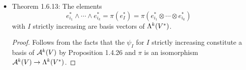 \documentclass[../notes.tex]{subfiles}
\begin{document}
\begin{itemize}
\begin{itemize}
    \end{itemize}
    \item Theorem 1.6.13: The elements
    \begin{equation*}
        e_{i_1}^*\wedge\cdots\wedge e_{i_k}^* = \pi(e_I^*) = \pi(e_{i_1}^*\otimes\cdots\otimes e_{i_k}^*)
    \end{equation*}
    with $I$ strictly increasing are basis vectors of $\lam[k]{V^*}$.
    \begin{proof}
        Follows from the facts that the $\psi_I$ for $I$ strictly increasing constitute a basis of $\alt[k]{V}$ by Proposition 1.4.26 and $\pi$ is an isomorphism $\alt[k]{V}\to\lam[k]{V^*}$.
    \end{proof}
\end{itemize}
\end{document}
